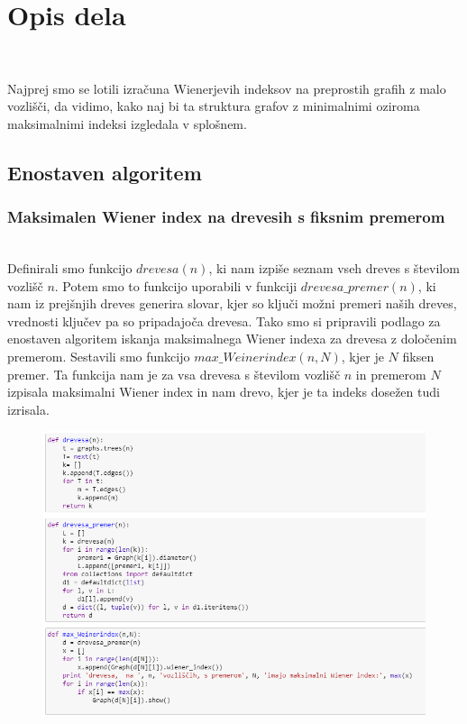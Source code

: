 \documentclass[12pt,a4paper]{amsart}
\theoremstyle{definition} %
\theoremstyle{plain} %
\begin{document}
\section{Opis dela}

\

Najprej smo se lotili izračuna Wienerjevih indeksov na preprostih grafih z malo vozlišči, da vidimo, kako naj bi ta struktura grafov 
z minimalnimi oziroma maksimalnimi indeksi izgledala v splošnem. 
\subsection{Enostaven algoritem}
\subsubsection{Maksimalen Wiener index na drevesih s fiksnim premerom}
\
\\
Definirali smo funkcijo $drevesa(n)$, ki nam izpiše seznam vseh dreves s številom vozlišč $n$. Potem smo to funkcijo uporabili v 
funkciji $drevesa\_premer(n)$, ki nam iz prejšnjih dreves generira slovar, kjer so ključi možni premeri naših dreves, vrednosti ključev pa so pripadajoča drevesa. Tako smo si pripravili podlago za enostaven algoritem iskanja maksimalnega Wiener indexa za drevesa z določenim premerom. 
Sestavili smo funkcijo $max\_Weinerindex(n,N)$, kjer je $N$ fiksen premer. Ta funkcija nam je za vsa drevesa s številom vozlišč $n$ in premerom $N$ izpisala maksimalni Wiener index in nam drevo, kjer je ta indeks dosežen tudi izrisala.
\begin{figure}[ht]
\centering
\includegraphics[width=1\textwidth]{slika1}
\end{figure}
\pagebreak
\end{document}
